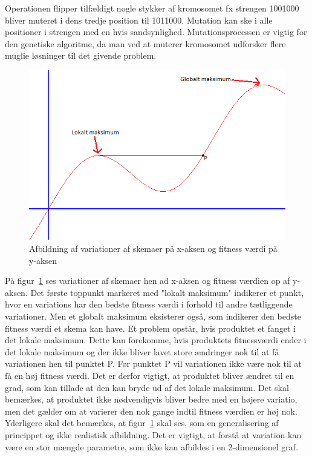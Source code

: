 Operationen flipper tilfældigt nogle stykker af kromosomet fx strengen 1001000 bliver muteret i dens tredje position til 1011000. Mutation kan ske i alle positioner i strengen med en hvis sandsynlighed. Mutationsprocessen er vigtig for den genetiske algoritme, da man ved at muterer kromosomet udforsker flere muglie løsninger til det givende problem.
\begin{figure}[!h]
  \includegraphics{partials/graphics/lokaltmaksimum.png}
  \caption{Afbildning af variationer af skemaer på x-aksen og fitness værdi på y-aksen}
  \label{fig:Lokalmax}
\end{figure}

På figur~\ref{fig:Lokalmax} ses variationer af skemaer hen ad x-aksen og fitness værdien op af y-aksen. Det første toppunkt markeret med "lokalt maksimum" indikerer et punkt, hvor en variations  har den bedste fitness værdi i forhold til andre tætliggende variationer. Men et globalt maksimum eksisterer også, som indikerer den bedste fitness værdi et skema kan have. Et problem opstår, hvis produktet et fanget i det lokale maksimum. Dette kan forekomme, hvis produktets fitnessværdi ender i det lokale maksimum og der ikke bliver lavet store ændringer nok til at få variationen hen til punktet P. Før punktet P vil variationen ikke være nok til at få en høj fitness værdi. Det er derfor vigtigt, at produktet bliver ændret til en grad, som kan tillade at den kan bryde ud af det lokale maksimum. Det skal bemærkes, at produktet ikke nødvendigvis bliver bedre med en højere variatio, men det gælder om at varierer den nok gange indtil fitness værdien er høj nok. Yderligere skal det bemærkes, at figur~\ref{fig:Lokalmax} skal ses, som en generalisering af princippet og ikke realistisk afbildning. Det er vigtigt, at forstå at variation kan være en stor mængde parametre, som ikke kan afbildes i en 2-dimensionel graf.

